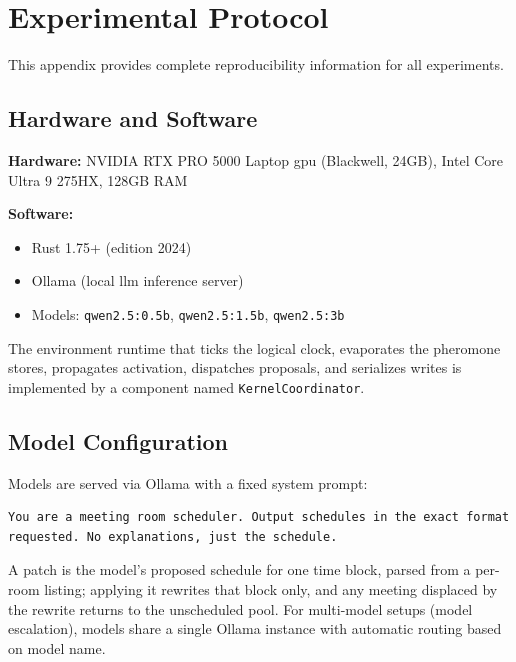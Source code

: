 
\section{Experimental Protocol}
\label{app:protocol}

This appendix provides complete reproducibility information for all experiments.

\subsection{Hardware and Software}
\label{app:hardware}

\textbf{Hardware:} NVIDIA RTX PRO 5000 Laptop \ac{gpu} (Blackwell, 24GB), Intel Core Ultra 9 275HX, 128GB RAM

\textbf{Software:}
\begin{itemize}
\item Rust 1.75+ (edition 2024)
\item Ollama (local \ac{llm} inference server)
\item Models: \texttt{qwen2.5:0.5b}, \texttt{qwen2.5:1.5b}, \texttt{qwen2.5:3b}
\end{itemize}

The environment runtime that ticks the logical clock, evaporates the pheromone stores, propagates activation, dispatches proposals, and serializes writes is implemented by a component named \texttt{KernelCoordinator}.

\subsection{Model Configuration}

Models are served via Ollama with a fixed system prompt:

\begin{lstlisting}
You are a meeting room scheduler. Output schedules in the exact format
requested. No explanations, just the schedule.
\end{lstlisting}

A patch is the model's proposed schedule for one time block, parsed from a per-room listing; applying it rewrites that block only, and any meeting displaced by the rewrite returns to the unscheduled pool. For multi-model setups (model escalation), models share a single Ollama instance with automatic routing based on model name.

